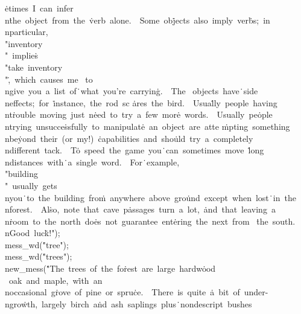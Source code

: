 \.{etimes\ I\ can\ infer\\n}\)\.{the\ object\ from\ the\ }\)\.{verb\ alone.\ \
Some\ ob}\)\.{jects\ also\ imply\ ver}\)\.{bs;\ in\\nparticular,\ }\)\.{%
\\"inventory\\"\ implie}\)\.{s\ \\"take\ inventory\\"}\)\.{,\ which\ causes\ me%
\ to}\)\.{\\ngive\ you\ a\ list\ of}\)\.{\ what\ you're\ carryin}\)\.{g.\ \ The%
\ objects\ have}\)\.{\ side\\neffects;\ for\ }\)\.{instance,\ the\ rod\ sc}\)%
\.{ares\ the\ bird.\ \ Usua}\)\.{lly\ people\ having\\nt}\)\.{rouble\ moving\
just\ n}\)\.{eed\ to\ try\ a\ few\ mor}\)\.{e\ words.\ \ Usually\ pe}\)\.{ople%
\\ntrying\ unsucce}\)\.{ssfully\ to\ manipulat}\)\.{e\ an\ object\ are\ atte}\)%
\.{mpting\ something\\nbe}\)\.{yond\ their\ (or\ my!)\ }\)\.{capabilities\ and\
sho}\)\.{uld\ try\ a\ completely}\)\.{\\ndifferent\ tack.\ \ T}\)\.{o\ speed\
the\ game\ you}\)\.{\ can\ sometimes\ move\ }\)\.{long\\ndistances\ with}\)\.{\
a\ single\ word.\ \ For}\)\.{\ example,\ \\"building}\)\.{\\"\ usually\ gets%
\\nyou}\)\.{\ to\ the\ building\ fro}\)\.{m\ anywhere\ above\ gro}\)\.{und\
except\ when\ lost}\)\.{\ in\ the\\nforest.\ \ Al}\)\.{so,\ note\ that\ cave\
p}\)\.{assages\ turn\ a\ lot,\ }\)\.{and\ that\ leaving\ a\\n}\)\.{room\ to\
the\ north\ do}\)\.{es\ not\ guarantee\ ent}\)\.{ering\ the\ next\ from\ }\)%
\.{the\ south.\\nGood\ luc}\)\.{k!"});\6
\\{mess\_wd}(\.{"tree"});\5
\\{mess\_wd}(\.{"trees"});\6
\\{new\_mess}(\.{"The\ trees\ of\ the\ fo}\)\.{rest\ are\ large\ hardw}\)\.{ood%
\ oak\ and\ maple,\ w}\)\.{ith\ an\\noccasional\ g}\)\.{rove\ of\ pine\ or\
spru}\)\.{ce.\ \ There\ is\ quite\ }\)\.{a\ bit\ of\ under-\\ngro}\)\.{wth,\
largely\ birch\ a}\)\.{nd\ ash\ saplings\ plus}\)\.{\ nondescript\ bushes\ }\)%
